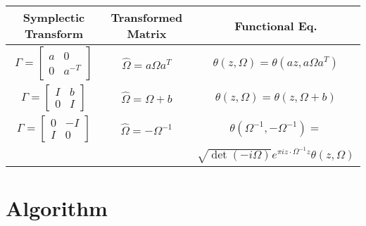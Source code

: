 \documentclass[12]{article}
\begin{document}
\begin{table}[h]
\label{tbl: transformations}

\centering
\begin{tabular}{ccc}
  Symplectic Transform & Transformed Matrix & Functional Eq. \\ \hline
  $\Gamma = \left[ \begin{smallmatrix} a & 0 \\ 0 &
      a^{-T} \end{smallmatrix} \right]$ & $\hat{\Omega} = a \Omega
  a^T$ & $\theta(z,\Omega) = \theta(az,a\Omega a^T)$ \\

  $\Gamma = \left[ \begin{smallmatrix} I & b \\ 0 &
      I \end{smallmatrix} \right]$ & $\hat{\Omega} = \Omega + b$ &
  $\theta(z,\Omega) = \theta(z, \Omega + b)$ \\

  $\Gamma = \left[ \begin{smallmatrix} 0 & -I \\ I &
      0 \end{smallmatrix} \right]$ & $\hat{\Omega} = -\Omega^{-1}$ &
  $\theta(\Omega^{-1}, -\Omega^{-1}) =$ \\

  & & $\sqrt{\det(-i\Omega)}e^{\pi i z \cdot \Omega^{-1} z} \theta(z,\Omega)$
\end{tabular}
\end{table}



\section{Algorithm}
\end{document}
